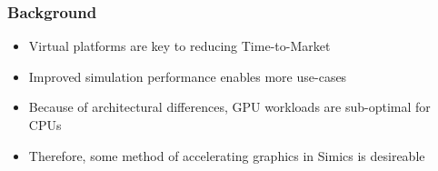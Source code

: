 \begin{frame}
\frametitle{Background}

\begin{itemize}
\item Virtual platforms are key to reducing Time-to-Market
\item Improved simulation performance enables more use-cases
\item Because of architectural differences, GPU workloads are sub-optimal for CPUs
\item Therefore, some method of accelerating graphics in Simics is desireable
\end{itemize}

\begin{center}
{\Huge \Shift \LArrow}
\end{center}

\end{frame}
